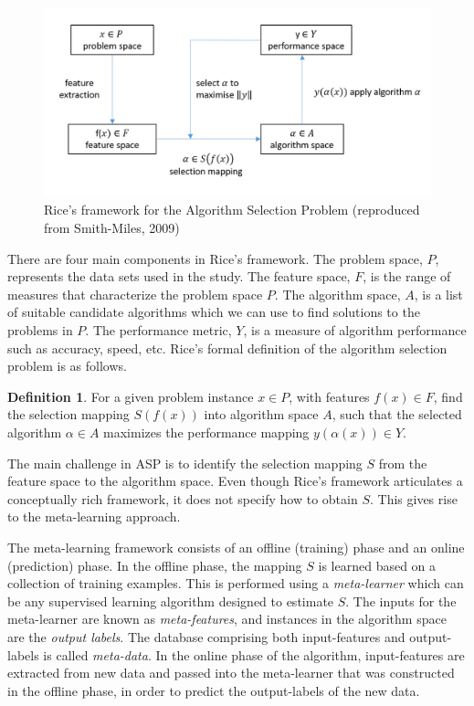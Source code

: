 \documentclass[11pt,a4paper,]{article}
\theoremstyle{definition}
\newtheorem{definition}{Definition}[section]
\theoremstyle{definition}
\theoremstyle{definition}
\theoremstyle{remark}
\begin{document}
\begin{figure}

{\centering \includegraphics[width=0.8\linewidth]{figures/RiceFramework} 

}

\caption{Rice's framework for the Algorithm Selection Problem (reproduced from Smith-Miles, 2009)}\label{fig:rice}
\end{figure}

There are four main components in Rice's framework. The problem space,
\(P\), represents the data sets used in the study. The feature space,
\(F\), is the range of measures that characterize the problem space
\(P\). The algorithm space, \(A\), is a list of suitable candidate
algorithms which we can use to find solutions to the problems in \(P\).
The performance metric, \(Y\), is a measure of algorithm performance
such as accuracy, speed, etc. Rice's formal definition of the algorithm
selection problem is \autocite{smith2009cross} as follows.

\begin{definition}
\label{def2}
For a given problem instance $x \in P$, with features $f(x) \in F$, find the selection mapping $S(f(x))$ into algorithm space $A$, such that the selected algorithm $\alpha \in A$ maximizes the performance mapping $y(\alpha(x)) \in Y$.
\end{definition}

The main challenge in ASP is to identify the selection mapping \(S\)
from the feature space to the algorithm space. Even though Rice's
framework articulates a conceptually rich framework, it does not specify
how to obtain \(S\). This gives rise to the meta-learning approach.

The meta-learning framework consists of an offline (training) phase and
an online (prediction) phase. In the offline phase, the mapping \(S\) is
learned based on a collection of training examples. This is performed
using a \emph{meta-learner} which can be any supervised learning
algorithm designed to estimate \(S\). The inputs for the meta-learner
are known as \emph{meta-features}, and instances in the algorithm space
are the \emph{output labels}. The database comprising both
input-features and output-labels is called \emph{meta-data}. In the
online phase of the algorithm, input-features are extracted from new
data and passed into the meta-learner that was constructed in the
offline phase, in order to predict the output-labels of the new data.
\end{document}
